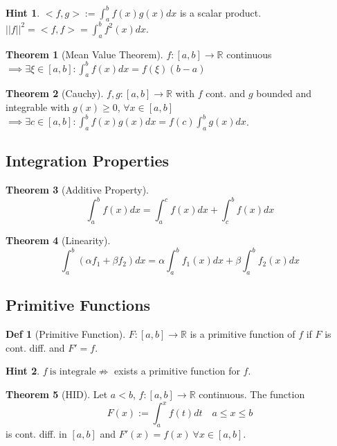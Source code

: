 \documentclass[a4paper, 10pt]{article}
\theoremstyle{definition}
\newtheorem*{definition}{Def}
\newtheorem*{note_wrapper}{Hint}
\theoremstyle{named}
\newtheorem*{ntheorem_wrapper}{Theorem}
\newenvironment{ntheorem}%
    {\begin{mdframed}[style=important]\begin{ntheorem_wrapper}}%
    {\end{ntheorem_wrapper}\end{mdframed}}
\newenvironment{note}%
    {\begin{mdframed}[style=trick]\begin{note_wrapper}}%
    {\end{note_wrapper}\end{mdframed}}
\newcommand{\R}{\mathbb{R}}
\begin{document}
\begin{note}
    $<f, g> := \int_a^b f(x)g(x) dx$ is a scalar product. \newline
    $||f||^2 = <f, f> = \int_a^b f^2(x) dx$.
\end{note}

\begin{ntheorem}[Mean Value Theorem]
    $f: [a, b] \to \R$ continuous $\implies \exists \xi \in [a, b]: \int_a^b f(x) dx = f(\xi)(b - a)$
\end{ntheorem}
\begin{ntheorem}[Cauchy]
    $f, g: [a, b] \to \R$ with $f$ cont. and $g$ bounded and integrable with $g(x) \geq 0$, $\forall x \in [a, b]$ $\implies \exists c \in [a, b]: \int_a^b f(x)g(x) dx = f(c)\int_a^b g(x) dx$.
\end{ntheorem}

\subsection{Integration Properties}
\begin{ntheorem}[Additive Property]
    $$\int_a^b f(x) dx = \int_a^c f(x) dx + \int_c^b f(x) dx$$
\end{ntheorem}

\begin{ntheorem}[Linearity]
    $$\int_a^b(\alpha f_1 + \beta f_2) dx = \alpha \int_a^b f_1(x) dx + \beta \int_a^b f_2(x) dx$$
\end{ntheorem}

\subsection{Primitive Functions}
\begin{definition}[Primitive Function]
    $F: [a, b] \to \R$ is a primitive function of $f$ if $F$ is cont. diff. and $F' = f$.
\end{definition}

\begin{note}
    $f \ \text{is integrale} \not\Rightarrow$ exists a primitive function for $f$.
\end{note}

\begin{ntheorem}[HID]
    Let $a < b$, $f: [a, b] \to \R$ continuous. The function 
    $$F(x) := \int_a^x f(t) dt \quad a \leq x \leq b$$
    is cont. diff. in $[a, b]$ and $F'(x) = f(x) \ \forall x \in [a, b]$.
\end{ntheorem}
\end{document}
